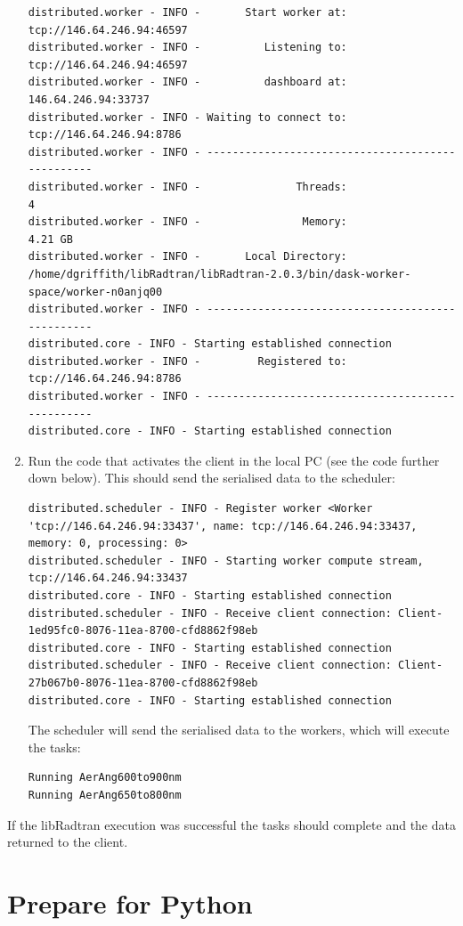 \begin{enumerate}
\begin{lstlisting}[style=tinysize]
distributed.worker - INFO -       Start worker at:  tcp://146.64.246.94:46597
distributed.worker - INFO -          Listening to:  tcp://146.64.246.94:46597
distributed.worker - INFO -          dashboard at:        146.64.246.94:33737
distributed.worker - INFO - Waiting to connect to:   tcp://146.64.246.94:8786
distributed.worker - INFO - -------------------------------------------------
distributed.worker - INFO -               Threads:                          4
distributed.worker - INFO -                Memory:                    4.21 GB
distributed.worker - INFO -       Local Directory: /home/dgriffith/libRadtran/libRadtran-2.0.3/bin/dask-worker-space/worker-n0anjq00
distributed.worker - INFO - -------------------------------------------------
distributed.core - INFO - Starting established connection
distributed.worker - INFO -         Registered to:   tcp://146.64.246.94:8786
distributed.worker - INFO - -------------------------------------------------
distributed.core - INFO - Starting established connection
\end{lstlisting}
\item Run the code that activates the client in the local PC (see the code further down below). This should send the serialised data to the scheduler:
\begin{lstlisting}[style=tinysize]
distributed.scheduler - INFO - Register worker <Worker 'tcp://146.64.246.94:33437', name: tcp://146.64.246.94:33437, memory: 0, processing: 0>
distributed.scheduler - INFO - Starting worker compute stream, tcp://146.64.246.94:33437
distributed.core - INFO - Starting established connection
distributed.scheduler - INFO - Receive client connection: Client-1ed95fc0-8076-11ea-8700-cfd8862f98eb
distributed.core - INFO - Starting established connection
distributed.scheduler - INFO - Receive client connection: Client-27b067b0-8076-11ea-8700-cfd8862f98eb
distributed.core - INFO - Starting established connection
\end{lstlisting}
The scheduler will send the serialised data to the workers, which will execute the tasks:
\begin{lstlisting}[style=tinysize]
Running AerAng600to900nm
Running AerAng650to800nm
\end{lstlisting}

\end{enumerate}
If the libRadtran execution was successful the tasks should complete and the data returned to the client.

\section{Prepare for Python}


